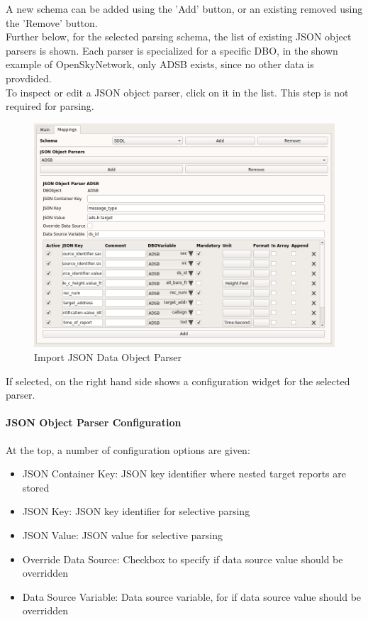 A new schema can be added using the 'Add' button, or an existing removed using the 'Remove' button. \\

Further below, for the selected parsing schema, the list of existing JSON object parsers is shown. Each parser is specialized for a specific DBO, in the shown example of OpenSkyNetwork, only ADSB exists, since no other data is provdided. \\

To inspect or edit a JSON object parser, click on it in the list. This step is not required for parsing.

\begin{figure}[H]
  \hspace*{-1cm}
    \includegraphics[width=16cm,frame]{../screenshots/import_json_data_object_parser.png}
  \caption{Import JSON Data Object Parser}
\end{figure}

If selected, on the right hand side shows a configuration widget for the selected parser.

\paragraph{JSON Object Parser Configuration}
At the top, a number of configuration options are given:

\begin{itemize}  
\item JSON Container Key: JSON key identifier where nested target reports are stored
\item JSON Key: JSON key identifier for selective parsing
\item JSON Value: JSON value for selective parsing
\item Override Data Source: Checkbox to specify if data source value should be overridden
\item Data Source Variable: Data source variable, for if data source value should be overridden
\end{itemize}


